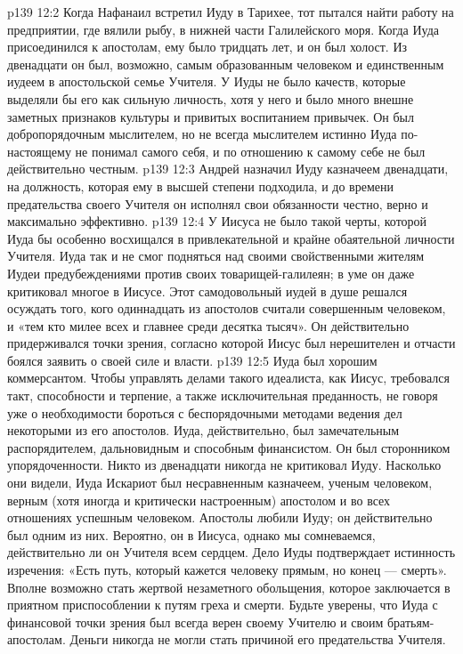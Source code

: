 \vs p139 12:2 \pc Когда Нафанаил встретил Иуду в Тарихее, тот пытался найти работу на предприятии, где вялили рыбу, в нижней части Галилейского моря. Когда Иуда присоединился к апостолам, ему было тридцать лет, и он был холост. Из двенадцати он был, возможно, самым образованным человеком и единственным иудеем в апостольской семье Учителя. У Иуды не было качеств, которые выделяли бы его как сильную личность, хотя у него и было много внешне заметных признаков культуры и привитых воспитанием привычек. Он был добропорядочным мыслителем, но не всегда мыслителем истинно  Иуда по\hyp{}настоящему не понимал самого себя, и по отношению к самому себе не был действительно честным.
\vs p139 12:3 Андрей назначил Иуду казначеем двенадцати, на должность, которая ему в высшей степени подходила, и до времени предательства своего Учителя он исполнял свои обязанности честно, верно и максимально эффективно.
\vs p139 12:4 \pc У Иисуса не было такой черты, которой Иуда бы особенно восхищался в привлекательной и крайне обаятельной личности Учителя. Иуда так и не смог подняться над своими свойственными жителям Иудеи предубеждениями против своих товарищей\hyp{}галилеян; в уме он даже критиковал многое в Иисусе. Этот самодовольный иудей в душе решался осуждать того, кого одиннадцать из апостолов считали совершенным человеком, и «тем кто милее всех и главнее среди десятка тысяч». Он действительно придерживался точки зрения, согласно которой Иисус был нерешителен и отчасти боялся заявить о своей силе и власти.
\vs p139 12:5 \pc Иуда был хорошим коммерсантом. Чтобы управлять делами такого идеалиста, как Иисус, требовался такт, способности и терпение, а также исключительная преданность, не говоря уже о необходимости бороться с беспорядочными методами ведения дел некоторыми из его апостолов. Иуда, действительно, был замечательным распорядителем, дальновидным и способным финансистом. Он был сторонником упорядоченности. Никто из двенадцати никогда не критиковал Иуду. Насколько они видели, Иуда Искариот был несравненным казначеем, ученым человеком, верным (хотя иногда и критически настроенным) апостолом и во всех отношениях успешным человеком. Апостолы любили Иуду; он действительно был одним из них. Вероятно, он  в Иисуса, однако мы сомневаемся, действительно ли он  Учителя всем сердцем. Дело Иуды подтверждает истинность изречения: «Есть путь, который кажется человеку прямым, но конец --- смерть». Вполне возможно стать жертвой незаметного обольщения, которое заключается в приятном приспособлении к путям греха и смерти. Будьте уверены, что Иуда с финансовой точки зрения был всегда верен своему Учителю и своим братьям\hyp{}апостолам. Деньги никогда не могли стать причиной его предательства Учителя.
